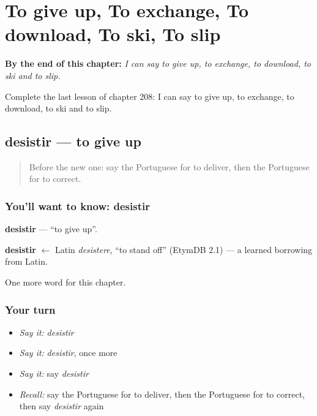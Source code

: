
\chapter{To give up, To exchange, To download, To ski, To slip}
\label{ch:pt-to-give-up-to-exchange-to-download-to-ski-to-slip}

\begin{chapteropening}
\textbf{By the end of this chapter:} \emph{I can say to give up, to exchange, to download, to ski and to slip.}

Complete the last lesson of chapter 208: I can say to give up, to exchange, to download, to ski and to slip.
\end{chapteropening}

\section[desistir]{desistir — to give up}

\label{lesson:PT-C208-desistir}



\begin{quote}
Before the new one: say the Portuguese for to deliver, then the Portuguese for to correct.
\end{quote}

\subsection*{You'll want to know: desistir}
\textbf{desistir} — \textquotedblleft{}to give up\textquotedblright{}.

\begin{cousinweb}
\textbf{desistir} $\leftarrow$ Latin \emph{desistere}, \textquotedblleft{}to stand off\textquotedblright{} (EtymDB 2.1) — a learned borrowing from Latin.
\end{cousinweb}

\begin{grammarlens}[title={What you've built}]
One more word for this chapter.
\end{grammarlens}

\subsection*{Your turn}
\begin{itemize}
\raggedright
  \item \emph{Say it:} \emph{desistir}
  \item \emph{Say it:} \emph{desistir}, once more
  \item \emph{Say it:} say \emph{desistir}
  \item \emph{Recall:} say the Portuguese for to deliver, then the Portuguese for to correct, then say \emph{desistir} again
\end{itemize}

